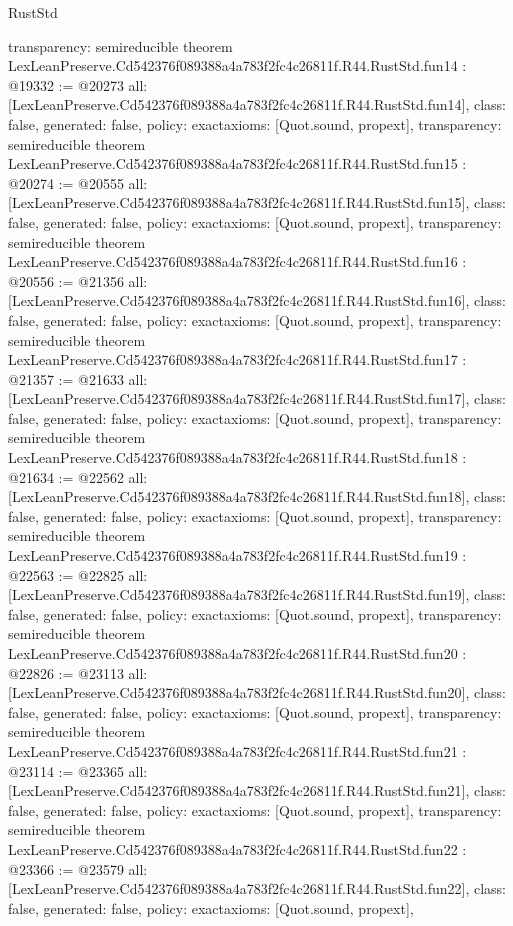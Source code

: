 \begin{lexlean}{RustStd}
\begin{coremodule}
{  transparency: semireducible
}
theorem LexLeanPreserve.Cd542376f089388a4a783f2fc4c26811f.R44.RustStd.fun14 : @19332 := @20273 {
  all: [LexLeanPreserve.Cd542376f089388a4a783f2fc4c26811f.R44.RustStd.fun14],
  class: false,
  generated: false,
  policy: exact{axioms: [Quot.sound, propext]},
  transparency: semireducible
}
theorem LexLeanPreserve.Cd542376f089388a4a783f2fc4c26811f.R44.RustStd.fun15 : @20274 := @20555 {
  all: [LexLeanPreserve.Cd542376f089388a4a783f2fc4c26811f.R44.RustStd.fun15],
  class: false,
  generated: false,
  policy: exact{axioms: [Quot.sound, propext]},
  transparency: semireducible
}
theorem LexLeanPreserve.Cd542376f089388a4a783f2fc4c26811f.R44.RustStd.fun16 : @20556 := @21356 {
  all: [LexLeanPreserve.Cd542376f089388a4a783f2fc4c26811f.R44.RustStd.fun16],
  class: false,
  generated: false,
  policy: exact{axioms: [Quot.sound, propext]},
  transparency: semireducible
}
theorem LexLeanPreserve.Cd542376f089388a4a783f2fc4c26811f.R44.RustStd.fun17 : @21357 := @21633 {
  all: [LexLeanPreserve.Cd542376f089388a4a783f2fc4c26811f.R44.RustStd.fun17],
  class: false,
  generated: false,
  policy: exact{axioms: [Quot.sound, propext]},
  transparency: semireducible
}
theorem LexLeanPreserve.Cd542376f089388a4a783f2fc4c26811f.R44.RustStd.fun18 : @21634 := @22562 {
  all: [LexLeanPreserve.Cd542376f089388a4a783f2fc4c26811f.R44.RustStd.fun18],
  class: false,
  generated: false,
  policy: exact{axioms: [Quot.sound, propext]},
  transparency: semireducible
}
theorem LexLeanPreserve.Cd542376f089388a4a783f2fc4c26811f.R44.RustStd.fun19 : @22563 := @22825 {
  all: [LexLeanPreserve.Cd542376f089388a4a783f2fc4c26811f.R44.RustStd.fun19],
  class: false,
  generated: false,
  policy: exact{axioms: [Quot.sound, propext]},
  transparency: semireducible
}
theorem LexLeanPreserve.Cd542376f089388a4a783f2fc4c26811f.R44.RustStd.fun20 : @22826 := @23113 {
  all: [LexLeanPreserve.Cd542376f089388a4a783f2fc4c26811f.R44.RustStd.fun20],
  class: false,
  generated: false,
  policy: exact{axioms: [Quot.sound, propext]},
  transparency: semireducible
}
theorem LexLeanPreserve.Cd542376f089388a4a783f2fc4c26811f.R44.RustStd.fun21 : @23114 := @23365 {
  all: [LexLeanPreserve.Cd542376f089388a4a783f2fc4c26811f.R44.RustStd.fun21],
  class: false,
  generated: false,
  policy: exact{axioms: [Quot.sound, propext]},
  transparency: semireducible
}
theorem LexLeanPreserve.Cd542376f089388a4a783f2fc4c26811f.R44.RustStd.fun22 : @23366 := @23579 {
  all: [LexLeanPreserve.Cd542376f089388a4a783f2fc4c26811f.R44.RustStd.fun22],
  class: false,
  generated: false,
  policy: exact{axioms: [Quot.sound, propext]},
}
\end{coremodule}
\end{lexlean}
